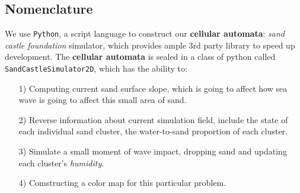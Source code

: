 \documentclass[12pt]{article}
\begin{document}
\subsection{Nomenclature}
We use \texttt{Python}, a script language to construct our \textbf{cellular automata}: \textit{sand castle foundation} simulator, which provides ample 3rd party library to speed up development. The \textbf{cellular automata} is sealed in a class of python called \texttt{SandCastleSimulator2D}, which has the ability to:

\begin{itemize}
    \item [1)]
          Computing current sand surface slope, which is going to affect how sea wave is going to affect this small area of sand.
    \item [2)]
          Reverse information about current simulation field, include the state of each individual sand cluster, the water-to-sand proportion of each cluster.
    \item [3)]
          Simulate a small moment of wave impact, dropping sand and updating each cluster's \textit{humidity}.
    \item [4)]
          Comstructing a color map for this particular problem.
\end{itemize}
\end{document}

